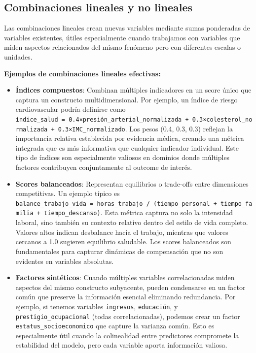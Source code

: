 \documentclass[
  letterpaper,
  DIV=11,
  numbers=noendperiod]{scrreprt}
\begin{document}
\subsection{Combinaciones lineales y no
lineales}\label{combinaciones-lineales-y-no-lineales}

Las combinaciones lineales crean nuevas variables mediante sumas
ponderadas de variables existentes, útiles especialmente cuando
trabajamos con variables que miden aspectos relacionados del mismo
fenómeno pero con diferentes escalas o unidades.

\textbf{Ejemplos de combinaciones lineales efectivas:}

\begin{itemize}
\item
  \textbf{Índices compuestos}: Combinan múltiples indicadores en un
  score único que captura un constructo multidimensional. Por ejemplo,
  un índice de riesgo cardiovascular podría definirse como
  \texttt{índice\_salud\ =\ 0.4×presión\_arterial\_normalizada\ +\ 0.3×colesterol\_normalizada\ +\ 0.3×IMC\_normalizado}.
  Los pesos (0.4, 0.3, 0.3) reflejan la importancia relativa establecida
  por evidencia médica, creando una métrica integrada que es más
  informativa que cualquier indicador individual. Este tipo de índices
  son especialmente valiosos en dominios donde múltiples factores
  contribuyen conjuntamente al outcome de interés.
\item
  \textbf{Scores balanceados}: Representan equilibrios o trade-offs
  entre dimensiones competitivas. Un ejemplo típico es
  \texttt{balance\_trabajo\_vida\ =\ horas\_trabajo\ /\ (tiempo\_personal\ +\ tiempo\_familia\ +\ tiempo\_descanso)}.
  Esta métrica captura no solo la intensidad laboral, sino también su
  contexto relativo dentro del estilo de vida completo. Valores altos
  indican desbalance hacia el trabajo, mientras que valores cercanos a
  1.0 sugieren equilibrio saludable. Los scores balanceados son
  fundamentales para capturar dinámicas de compensación que no son
  evidentes en variables absolutas.
\item
  \textbf{Factores sintéticos}: Cuando múltiples variables
  correlacionadas miden aspectos del mismo constructo subyacente, pueden
  condensarse en un factor común que preserve la información esencial
  eliminando redundancia. Por ejemplo, si tenemos variables
  \texttt{ingresos}, \texttt{educación}, y
  \texttt{prestigio\_ocupacional} (todas correlacionadas), podemos crear
  un factor \texttt{estatus\_socioeconomico} que capture la varianza
  común. Esto es especialmente útil cuando la colinealidad entre
  predictores compromete la estabilidad del modelo, pero cada variable
  aporta información valiosa.
\end{itemize}
\end{document}
